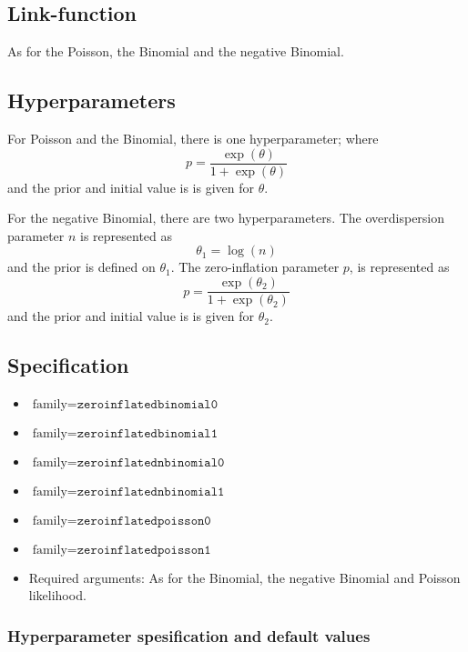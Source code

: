 \documentclass[a4paper,11pt]{article}
\begin{document}
\subsection*{Link-function}

As for the Poisson, the Binomial and the negative Binomial.

\subsection*{Hyperparameters}

For Poisson and the Binomial, there is one hyperparameter; where
\begin{displaymath}
    p = \frac{\exp(\theta)}{1+\exp(\theta)}
\end{displaymath}
and the prior and initial value is is given for $\theta$.

For the negative Binomial, there are two hyperparameters.  The
overdispersion parameter $n$ is represented as
\begin{displaymath}
    \theta_{1} = \log(n)
\end{displaymath}
and the prior is defined on $\theta_{1}$. The zero-inflation parameter
$p$, is represented as
\begin{displaymath}
    p = \frac{\exp(\theta_{2})}{1+\exp(\theta_{2})}
\end{displaymath}
and the prior and initial value is is given for $\theta_{2}$.

\subsection*{Specification}

\begin{itemize}
\item $\text{family}=\texttt{zeroinflatedbinomial0}$
\item $\text{family}=\texttt{zeroinflatedbinomial1}$
\item $\text{family}=\texttt{zeroinflatednbinomial0}$
\item $\text{family}=\texttt{zeroinflatednbinomial1}$
\item $\text{family}=\texttt{zeroinflatedpoisson0}$
\item $\text{family}=\texttt{zeroinflatedpoisson1}$
\item Required arguments: As for the Binomial, the negative Binomial
    and Poisson likelihood.
\end{itemize}

\subsubsection*{Hyperparameter spesification and default values}
\end{document}

